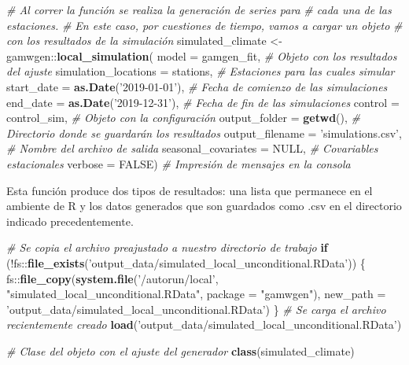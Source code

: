 \documentclass[
  12pt]{article}
\newenvironment{Shaded}{}{}
\newcommand{\CommentTok}[1]{\textcolor[rgb]{0.38,0.63,0.69}{\textit{#1}}}
\newcommand{\ControlFlowTok}[1]{\textcolor[rgb]{0.00,0.44,0.13}{\textbf{#1}}}
\newcommand{\DataTypeTok}[1]{\textcolor[rgb]{0.56,0.13,0.00}{#1}}
\newcommand{\KeywordTok}[1]{\textcolor[rgb]{0.00,0.44,0.13}{\textbf{#1}}}
\newcommand{\NormalTok}[1]{#1}
\newcommand{\OperatorTok}[1]{\textcolor[rgb]{0.40,0.40,0.40}{#1}}
\newcommand{\OtherTok}[1]{\textcolor[rgb]{0.00,0.44,0.13}{#1}}
\newcommand{\StringTok}[1]{\textcolor[rgb]{0.25,0.44,0.63}{#1}}
\begin{document}
\begin{Shaded}
\begin{Highlighting}[]
\CommentTok{# Al correr la función se realiza la generación de series para }
\CommentTok{# cada una de las estaciones. }
\CommentTok{# En este caso, por cuestiones de tiempo, vamos a cargar un objeto }
\CommentTok{# con los resultados de la simulación }
\NormalTok{simulated_climate <-}\StringTok{ }\NormalTok{gamwgen}\OperatorTok{::}\KeywordTok{local_simulation}\NormalTok{(}
  \DataTypeTok{model =}\NormalTok{ gamgen_fit, }
  \CommentTok{# Objeto con los resultados del ajuste}
  \DataTypeTok{simulation_locations =}\NormalTok{ stations, }
  \CommentTok{# Estaciones para las cuales simular}
  \DataTypeTok{start_date =} \KeywordTok{as.Date}\NormalTok{(}\StringTok{'2019-01-01'}\NormalTok{), }
  \CommentTok{# Fecha de comienzo de las simulaciones}
  \DataTypeTok{end_date =} \KeywordTok{as.Date}\NormalTok{(}\StringTok{'2019-12-31'}\NormalTok{), }
  \CommentTok{# Fecha de fin de las simulaciones}
  \DataTypeTok{control =}\NormalTok{ control_sim, }
  \CommentTok{# Objeto con la configuración}
  \DataTypeTok{output_folder =} \KeywordTok{getwd}\NormalTok{(), }
  \CommentTok{# Directorio donde se guardarán los resultados}
  \DataTypeTok{output_filename =} \StringTok{'simulations.csv'}\NormalTok{, }
  \CommentTok{# Nombre del archivo de salida}
  \DataTypeTok{seasonal_covariates =} \OtherTok{NULL}\NormalTok{, }
  \CommentTok{# Covariables estacionales}
  \DataTypeTok{verbose =} \OtherTok{FALSE}\NormalTok{) }
  \CommentTok{# Impresión de mensajes en la consola}
\end{Highlighting}
\end{Shaded}

Esta función produce dos tipos de resultados: una lista que permanece en el ambiente de R y los datos generados que son guardados como .csv en el directorio indicado precedentemente.

\begin{Shaded}
\begin{Highlighting}[]
\CommentTok{# Se copia el archivo preajustado a nuestro directorio de trabajo}
\ControlFlowTok{if}\NormalTok{ (}\OperatorTok{!}\NormalTok{fs}\OperatorTok{::}\KeywordTok{file_exists}\NormalTok{(}\StringTok{'output_data/simulated_local_unconditional.RData'}\NormalTok{)) \{}
\NormalTok{  fs}\OperatorTok{::}\KeywordTok{file_copy}\NormalTok{(}\KeywordTok{system.file}\NormalTok{(}\StringTok{'/autorun/local'}\NormalTok{, }\StringTok{"simulated_local_unconditional.RData"}\NormalTok{,}
                            \DataTypeTok{package =} \StringTok{"gamwgen"}\NormalTok{),}
                \DataTypeTok{new_path =} \StringTok{'output_data/simulated_local_unconditional.RData'}\NormalTok{)}
\NormalTok{\}  }
\CommentTok{# Se carga el archivo recientemente creado}
\KeywordTok{load}\NormalTok{(}\StringTok{'output_data/simulated_local_unconditional.RData'}\NormalTok{)}

\CommentTok{# Clase del objeto con el ajuste del generador}
\KeywordTok{class}\NormalTok{(simulated_climate)}
\end{Highlighting}
\end{Shaded}
\end{document}
